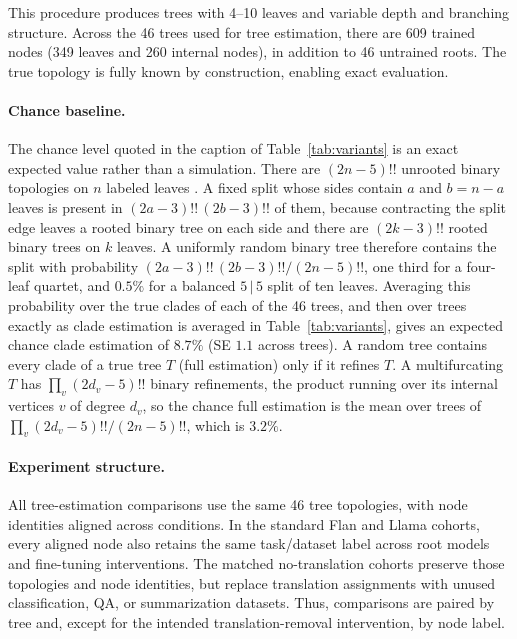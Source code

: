 \documentclass{article}
\theoremstyle{definition}
\theoremstyle{plain}
\begin{document}
This procedure produces trees with 4--10 leaves and variable depth and branching
structure. Across the 46 trees used for tree estimation, there are 609 trained nodes (349 leaves and 260 internal
nodes), in addition to 46 untrained roots. The true topology is fully known by construction,
enabling exact evaluation.

\paragraph{Chance baseline.} The chance level quoted in the caption of Table~\ref{tab:variants} is an
exact expected value rather than a simulation. There are $(2n-5)!!$ unrooted binary topologies on $n$
labeled leaves \citep{sempleSteel2003phylogenetics}. A fixed split whose sides contain $a$ and
$b=n-a$ leaves is present in $(2a-3)!!\,(2b-3)!!$ of them, because contracting the split edge
leaves a rooted binary tree on each side and there are $(2k-3)!!$ rooted binary trees on $k$ leaves.
A uniformly random binary tree therefore contains the split with probability
$(2a-3)!!\,(2b-3)!!/(2n-5)!!$, one third for a four-leaf quartet, and $0.5\%$ for a balanced
$5\,|\,5$ split of ten leaves. Averaging this probability over the true clades of each of the 46
trees, and then over trees exactly as clade estimation is averaged in
Table~\ref{tab:variants}, gives an expected chance clade estimation of $8.7\%$ (SE $1.1$ across
trees). A random tree contains every clade of a true tree $T$ (full estimation) only if it refines $T$. A
multifurcating $T$ has $\prod_v (2d_v-5)!!$ binary refinements, the product running over its
internal vertices $v$ of degree $d_v$, so the chance full estimation is the mean over trees of
$\prod_v (2d_v-5)!!/(2n-5)!!$, which is $3.2\%$.

\paragraph{Experiment structure.} All tree-estimation comparisons use the same 46
tree topologies, with node identities aligned across conditions. In the standard Flan
and Llama cohorts, every aligned node also retains the same task/dataset label across root models
and fine-tuning interventions. The matched no-translation cohorts preserve those topologies
and node identities, but replace translation assignments with unused classification, QA, or
summarization datasets. Thus, comparisons are paired by tree and,
except for the intended translation-removal intervention, by node label.
\end{document}
